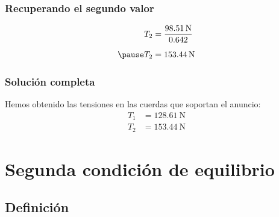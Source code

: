 \documentclass[12pt]{beamer}
\begin{document}
\begin{frame}
\frametitle{Recuperando el segundo valor}
\begin{eqnarray*}
\begin{aligned}
T_{2} &= \dfrac{\SI{98.51}{\newton}}{0.642} \\[0.5em] \pause
T_{2} &= \SI{153.44}{\newton}
\end{aligned}
\end{eqnarray*}
\end{frame}
\begin{frame}
\frametitle{Solución completa}
Hemos obtenido las tensiones en las cuerdas que soportan el anuncio:
\begin{align*}
T_{1} &= \SI{128.61}{\newton} \\[0.5em]
T_{2} &= \SI{153.44}{\newton}
\end{align*}
\end{frame}

\section{Segunda condición de equilibrio}
\subsection{Definición}
\end{document}
